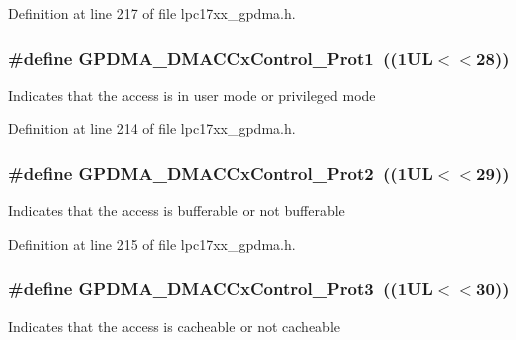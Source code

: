\-Definition at line 217 of file lpc17xx\-\_\-gpdma.\-h.

\hypertarget{group___g_p_d_m_a___private___macros_ga883ee41e16f8df248437075cebab7993}{
\subsubsection[{\-G\-P\-D\-M\-A\-\_\-\-D\-M\-A\-C\-Cx\-Control\-\_\-\-Prot1}]{\setlength{\rightskip}{0pt plus 5cm}\#define {\bf \-G\-P\-D\-M\-A\-\_\-\-D\-M\-A\-C\-Cx\-Control\-\_\-\-Prot1}~((1\-U\-L$<$$<$28))}}\label{group___g_p_d_m_a___private___macros_ga883ee41e16f8df248437075cebab7993}
\-Indicates that the access is in user mode or privileged mode 

\-Definition at line 214 of file lpc17xx\-\_\-gpdma.\-h.

\hypertarget{group___g_p_d_m_a___private___macros_gabe38faff26ee3951122c23ff1425d70a}{
\subsubsection[{\-G\-P\-D\-M\-A\-\_\-\-D\-M\-A\-C\-Cx\-Control\-\_\-\-Prot2}]{\setlength{\rightskip}{0pt plus 5cm}\#define {\bf \-G\-P\-D\-M\-A\-\_\-\-D\-M\-A\-C\-Cx\-Control\-\_\-\-Prot2}~((1\-U\-L$<$$<$29))}}\label{group___g_p_d_m_a___private___macros_gabe38faff26ee3951122c23ff1425d70a}
\-Indicates that the access is bufferable or not bufferable 

\-Definition at line 215 of file lpc17xx\-\_\-gpdma.\-h.

\hypertarget{group___g_p_d_m_a___private___macros_gaf6a439bbf5a4b082fa7f36effca23f15}{
\subsubsection[{\-G\-P\-D\-M\-A\-\_\-\-D\-M\-A\-C\-Cx\-Control\-\_\-\-Prot3}]{\setlength{\rightskip}{0pt plus 5cm}\#define {\bf \-G\-P\-D\-M\-A\-\_\-\-D\-M\-A\-C\-Cx\-Control\-\_\-\-Prot3}~((1\-U\-L$<$$<$30))}}\label{group___g_p_d_m_a___private___macros_gaf6a439bbf5a4b082fa7f36effca23f15}
\-Indicates that the access is cacheable or not cacheable 

